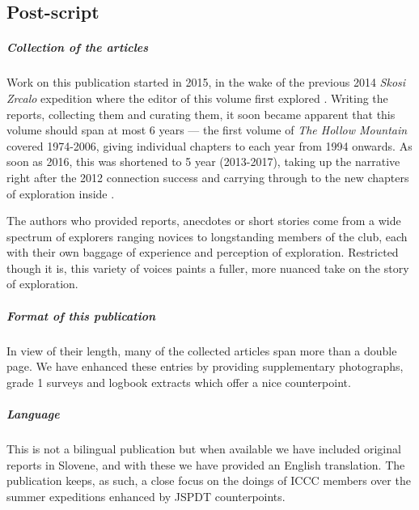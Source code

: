 \newpage
 
 \begin{tcolorbox}
 	\begin{fullwidth}
 	\chapter{Post-script}
 		\begin{multicols}{2}


 			\paragraph{Collection of the articles}

 			Work on this publication started in 2015, in the wake of the previous 2014 \emph{Skosi Zrcalo} expedition where the editor of this volume first explored . Writing the reports, collecting them and curating them, it soon became apparent that this volume should span at most 6 years --- the first volume of \emph{The Hollow Mountain} covered 1974-2006, giving individual chapters to each year  from 1994 onwards. As soon as 2016, this was shortened to 5 year (2013-2017), taking up the narrative right after the 2012 connection success and carrying through to the new chapters of exploration inside .


 			The authors who provided reports, anecdotes or short stories come from a wide spectrum of explorers ranging novices to longstanding members of the club, each with their own baggage of experience and perception of exploration. Restricted though it is, this variety of voices paints a fuller, more nuanced take on the story of exploration.

 			\paragraph{Format of this publication}

 			In view of their length, many of the collected articles span more than a double page. We have enhanced these entries by providing supplementary photographs, grade 1 surveys and logbook extracts which offer a nice counterpoint.


 			\paragraph{Language}

 			This is not a bilingual publication but when available we have included original reports in Slovene, and with these we have provided an English translation. The publication keeps, as such, a close focus on the doings of ICCC members over the summer expeditions enhanced by JSPDT counterpoints. 



\end{multicols}
\end{fullwidth}
\end{tcolorbox}
